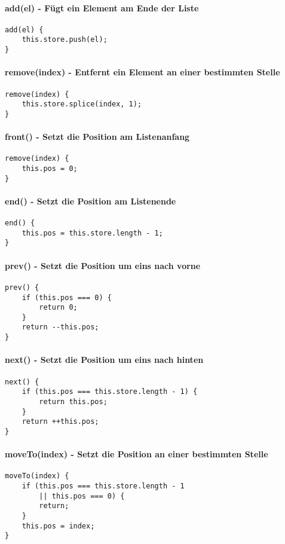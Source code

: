 \documentclass{book}
\begin{document}
\paragraph{add(el) - Fügt ein Element am Ende der Liste}
\begin{lstlisting}[caption=Array Konstruktor]
add(el) {
	this.store.push(el);
}
\end{lstlisting}
\paragraph{remove(index) - Entfernt ein Element an einer bestimmten Stelle}
\begin{lstlisting}[caption=Array Konstruktor]
remove(index) {
	this.store.splice(index, 1);
}
\end{lstlisting}
\paragraph{front() - Setzt die Position am Listenanfang}
\begin{lstlisting}[caption=Array Konstruktor]
remove(index) {
	this.pos = 0;
}
\end{lstlisting}
\paragraph{end() - Setzt die Position am Listenende}
\begin{lstlisting}[caption=Array Konstruktor]
end() {
	this.pos = this.store.length - 1;
}
\end{lstlisting}

\paragraph{prev() - Setzt die Position um eins nach vorne}
\begin{lstlisting}[caption=Array Konstruktor]
prev() {
	if (this.pos === 0) {
		return 0;
	}
	return --this.pos;
}
\end{lstlisting}
\paragraph{next() - Setzt die Position um eins nach hinten}
\begin{lstlisting}[caption=Array Konstruktor]
next() {
	if (this.pos === this.store.length - 1) {
		return this.pos;
	}
	return ++this.pos;
}
\end{lstlisting}
\paragraph{moveTo(index) - Setzt die Position an einer bestimmten Stelle}
\begin{lstlisting}[caption=Array Konstruktor]
moveTo(index) {
	if (this.pos === this.store.length - 1 
		|| this.pos === 0) {
		return;
	}
	this.pos = index;
}
\end{lstlisting}
\end{document}
